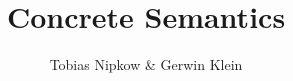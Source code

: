 \documentclass[11pt,a4paper]{article}
\begin{document}
\title{Concrete Semantics}
\author{Tobias Nipkow \& Gerwin Klein}
\maketitle

\setcounter{tocdepth}{2}
\tableofcontents
\newpage



\nocite{Nipkow}
\nocite{ConcreteSemantics}



\end{document}
